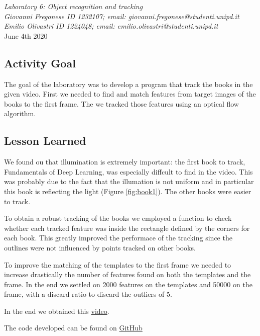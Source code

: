 \documentclass[a4paper,11pt]{article}
\makeatletter
\newcommand{\expT}{Object recognition and tracking}
\newcommand{\cand}{Giovanni Fregonese ID 1232107; email: giovanni.fregonese@studenti.unipd.it \\
                   Emilio Olivastri ID 1224048; email: emilio.olivastri@studenti.unipd.it}
\newcommand{\dateD}{June 4th 2020}
\makeatother
\begin{document}
\begin{center}
	\Large
	\begin{center}
		\textsl{Laboratory 6: \expT}\\
		\large
		\hfill\break
		\textsl{\cand}\\
		\dateD
	\end{center}
\end{center}

\subsection*{Activity Goal}

The goal of the laboratory was to develop a program that track the books in the given video.
First we needed to find and match features from target images of the books to the first frame.
The we tracked those features using an optical flow algorithm. 


\subsection*{Lesson Learned}

We found ou that illumination is extremely important: the first book to track, Fundamentals of Deep Learning, was especially diffcult to find in the video.
This was probably due to the fact that the illumation is not uniform and in particular this book is reflecting the light (Figure \ref{fig:book1}). 
The other books were easier to track.

To obtain a robust tracking of the books we employed a function to check whether each tracked feature was inside the rectangle defined by the corners for each book.
This greatly improved the performace of the tracking since the outlines were not influenced by points tracked on other books.

To improve the matching of the templates to the first frame we needed to increase drastically the number of features found on both the templates and the frame.
In the end we settled on 2000 features on the templates and 50000 on the frame, with a discard ratio to discard the outliers of 5.

In the end we obtained this \href{https://youtu.be/u_683hzvI8o}{video}.

The code developed can be found on \href{https://github.com/giotherobot/Lab6_CV}{GitHub}
\end{document}
